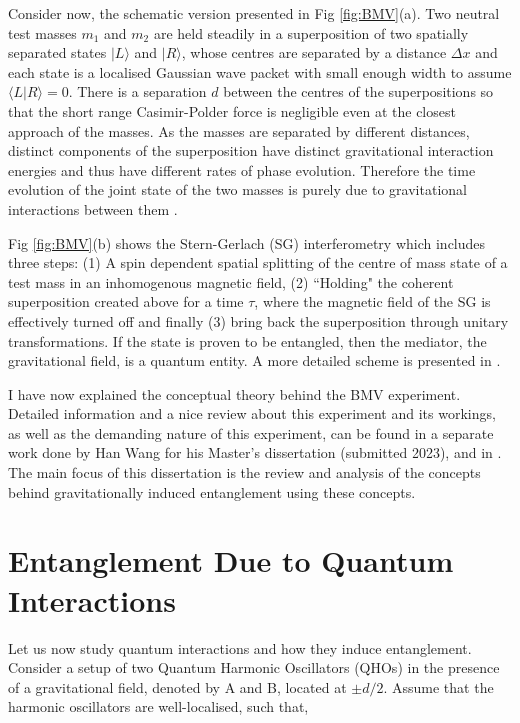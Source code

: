 \documentclass[12pt,a4paper]{report}
\theoremstyle{plain}
\theoremstyle{definition}
\theoremstyle{remark}
\begin{document}
 Consider now, the schematic version presented in Fig \ref{fig:BMV}(a). Two neutral test masses $m_1$ and $m_2$ are held steadily in a superposition of two spatially separated states $|L\rangle$ and  $|R\rangle$, whose centres are separated by a distance $\Delta x$ and each state is a localised Gaussian wave packet with small enough width to assume $\langle L|R\rangle = 0$. There is a separation $d$ between the centres of the superpositions so that the short range Casimir-Polder force is negligible even at the closest approach of the masses. As the masses are separated by different distances, distinct components of the superposition have distinct gravitational interaction energies and thus have different rates of phase evolution. Therefore the time evolution of the joint state of the two masses is purely due to gravitational interactions between them \cite{Bose_2017}.

Fig \ref{fig:BMV}(b) shows the Stern-Gerlach (SG) interferometry which includes three steps: (1) A spin dependent spatial splitting of the centre of mass state of a test mass in an inhomogenous magnetic field, (2) ``Holding" the coherent superposition created above for a time $\tau$, where the magnetic field of the SG is effectively turned off and finally (3) bring back the superposition through unitary transformations. If the state is proven to be entangled, then the mediator, the gravitational field, is a quantum entity. A more detailed scheme is presented in \citet{Bose_2017}.

I have now explained the conceptual theory behind the BMV experiment. Detailed information and a nice review about this experiment and its workings, as well as the demanding nature of this experiment, can be found in a separate work done by Han Wang \cite{han} for his Master's dissertation (submitted 2023), and in \citet{Christodoulou_2020}. The main focus of this dissertation is the review and analysis of the concepts behind gravitationally induced entanglement using these concepts.

\section{Entanglement Due to Quantum Interactions} \label{sec: QHOs}
Let us now study quantum interactions and how they induce entanglement. Consider a setup of two Quantum Harmonic Oscillators (QHOs) in the presence of a gravitational field, denoted by A and B, located at $\pm d/2$. Assume that the harmonic oscillators are well-localised, such that,
\end{document}
